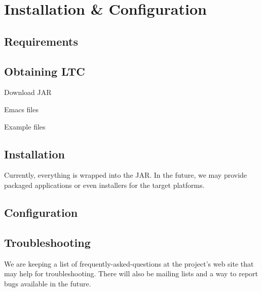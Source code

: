 \chapter{Installation \& Configuration} \label{ch:install}

\section{Requirements}

\section{Obtaining LTC}

Download JAR

Emacs files

Example files

\section{Installation}

Currently, everything is wrapped into the JAR.  In the future, we may provide packaged applications or even installers for the target platforms.

\section{Configuration}

\section{Troubleshooting}

We are keeping a list of frequently-asked-questions at the project's web site that may help for troubleshooting.  There will also be mailing lists and a way to report bugs available in the future.

